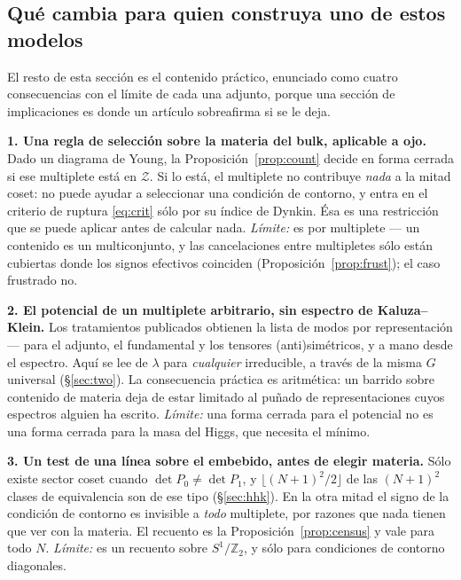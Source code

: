 \documentclass[11pt,a4paper]{article}
\newcommand{\ZZ}{\mathbb{Z}}
\begin{document}
\subsection*{Qué cambia para quien construya uno de estos modelos}

El resto de esta sección es el contenido práctico, enunciado como cuatro consecuencias con el límite
de cada una adjunto, porque una sección de implicaciones es donde un artículo sobreafirma si se le
deja.

\textbf{1. Una regla de selección sobre la materia del bulk, aplicable a ojo.} Dado un diagrama de
Young, la Proposición~\ref{prop:count} decide en forma cerrada si ese multiplete está en
$\mathcal Z$. Si lo está, el multiplete no contribuye \emph{nada} a la mitad coset: no puede ayudar a
seleccionar una condición de contorno, y entra en el criterio de ruptura \eqref{eq:crit} sólo por su
índice de Dynkin. Ésa es una restricción que se puede aplicar antes de calcular nada. \emph{Límite:}
es por multiplete --- un contenido es un multiconjunto, y las cancelaciones entre multipletes sólo
están cubiertas donde los signos efectivos coinciden (Proposición~\ref{prop:frust}); el caso
frustrado no.

\textbf{2. El potencial de un multiplete arbitrario, sin espectro de Kaluza--Klein.} Los tratamientos
publicados obtienen la lista de modos por representación --- \cite{HY} para el adjunto, el
fundamental y los tensores (anti)simétricos, \cite{AHMN} y \cite{KKKY} a mano desde el espectro.
Aquí se lee de $\lambda$ para \emph{cualquier} irreducible, a través de la misma $G$ universal
(\S\ref{sec:two}). La consecuencia práctica es aritmética: un barrido sobre contenido de materia deja
de estar limitado al puñado de representaciones cuyos espectros alguien ha escrito. \emph{Límite:}
una forma cerrada para el potencial no es una forma cerrada para la masa del Higgs, que necesita el
mínimo.

\textbf{3. Un test de una línea sobre el embebido, antes de elegir materia.} Sólo existe sector coset
cuando $\det P_0\neq\det P_1$, y $\lfloor(N+1)^2/2\rfloor$ de las $(N+1)^2$ clases de equivalencia
son de ese tipo (\S\ref{sec:hhk}). En la otra mitad el signo de la condición de contorno es invisible
a \emph{todo} multiplete, por razones que nada tienen que ver con la materia. El recuento es la
Proposición~\ref{prop:census} y vale para todo $N$. \emph{Límite:} es un recuento sobre
$S^1/\ZZ_2$, y sólo para condiciones de contorno diagonales.
\end{document}
